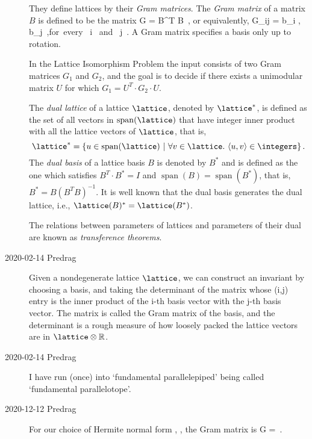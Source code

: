 \begin{description}
They define lattices by their \emph{Gram matrices}.
The {\em Gram matrix} of a matrix $B$ is defined to be the matrix
\beq
G = B^T \cdot B
\,,
or equivalently,
\beq
G_{ij} = \langle b_i , b_j \rangle
\,,\qquad \mbox{for every } i \mbox{ and } j
\,.
A Gram matrix specifies a basis only up to rotation.

In the Lattice Isomorphism Problem the input consists of two Gram
matrices $G_1$ and $G_2$, and the goal is to decide if there exists a
unimodular matrix $U$ for which $G_1 = U^T \cdot G_2 \cdot U$.

The {\em dual lattice} of a lattice $\lattice$, denoted by $\lattice^*$,
is defined as the set of all vectors in
${\mathop{\mathrm{span}}}(\lattice)$ that have integer inner product with
all the lattice vectors of $\lattice$, that is,
\[
\lattice^* = \{u \in
{\mathop{\mathrm{span}}}(\lattice)~|~\forall v \in \lattice.~\langle u,v
\rangle \in \integers \}
\,.
\]
The {\em dual basis} of a lattice basis $B$ is
denoted by $B^*$ and is defined as the one which satisfies $B^T \cdot B^*
= I$ and ${\mathop{\mathrm{span}}}(B)={\mathop{\mathrm{span}}}(B^*)$,
that is, $B^* = B(B^T B)^{-1}$. It is well known that the dual basis
generates the dual lattice, i.e., $\lattice(B)^* = \lattice(B^*)$.

The relations between parameters of lattices and parameters of their dual
are known as {\em transference theorems}.

\item[2020-02-14 Predrag]
Given a nondegenerate lattice $\lattice$, we can construct an invariant by
choosing a basis, and taking the determinant of the matrix whose (i,j)
entry is the inner product of the i-th basis vector with the j-th basis
vector. The matrix is called the Gram matrix of the basis, and the
determinant is a rough measure of how loosely packed the lattice vectors
are in $\lattice\otimes\mathbb{R}$.

\item[2020-02-14 Predrag]
I have run (once) into `fundamental parallelepiped' being called
`fundamental parallelotope'.

\item[2020-12-12 Predrag]
For our choice of Hermite normal form ,
, the {Gram matrix}  is
\beq
G =
\,.


\end{description}
